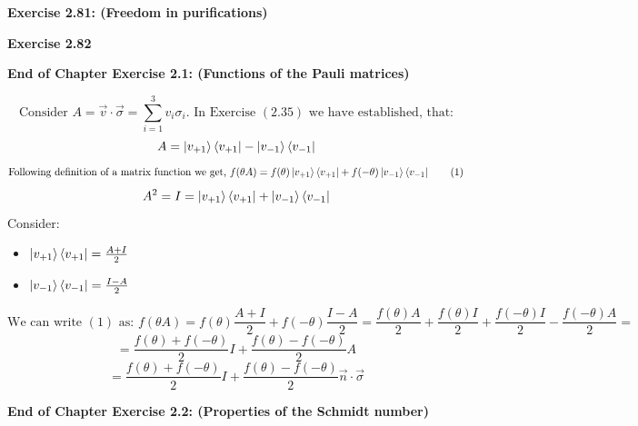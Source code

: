 \documentclass{article}
\begin{document}
\bigskip

\begin{framed}
    \noindent \textbf{Exercise 2.81: (Freedom in purifications)}
    
    \medskip
    
    
\end{framed}

\bigskip

\begin{framed}
    \noindent \textbf{Exercise 2.82}
    
    \medskip
    
    
\end{framed}

\bigskip

\begin{framed}
    \noindent \textbf{End of Chapter Exercise 2.1: (Functions of the Pauli matrices)}
    
    \medskip
    $$
    \text{Consider } A = \vec{v} \cdot \vec{\sigma} = \sum_{i=1}^{3}{v_i\sigma_i}. \text{ In Exercise } (2.35)  \text{ we have established, that:}
    $$
    $$
        A = \ket{v_{+1}}\bra{v_{+1}} - \ket{v_{-1}}\bra{v_{-1}}
    $$
    \begin{equation}
    \text{Following definition of a matrix function we get, } f(\theta A) = f(\theta)\ket{v_{+1}}\bra{v_{+1}}+f(-\theta)\ket{v_{-1}}\bra{v_{-1}}
    \tag{1}
    \end{equation}
    $$
    A^2 = I = \ket{v_{+1}}\bra{v_{+1}} + \ket{v_{-1}}\bra{v_{-1}} 
    $$
    Consider:
    \begin{itemize}
        \item $\ket{v_{+1}}\bra{v_{+1}} = \frac{A + I}{2}$
        \item $\ket{v_{-1}}\bra{v_{-1}} = \frac{I -A}{2}$
    \end{itemize}
    $$
    \text{We can write } (1) \text{ as: } f(\theta A) = f(\theta)\frac{A + I}{2} + f(-\theta) \frac{I -A}{2} = \frac{f(\theta)A}{2} + \frac{f(\theta)I}{2} + \frac{f(-\theta)I}{2} - \frac{f(-\theta)A}{2} = 
    $$
    $$
    = \frac{f(\theta) + f(-\theta)}{2}I + \frac{f(\theta) - f(-\theta)}{2}A 
    $$
    $$
    = \frac{f(\theta) + f(-\theta)}{2}I + \frac{f(\theta) - f(-\theta)}{2}\vec{n} \cdot \vec{\sigma} 
    $$
    
\end{framed}

\bigskip

\begin{framed}
    \noindent \textbf{End of Chapter Exercise 2.2: (Properties of the Schmidt number)}
    
    \medskip
    
    
\end{framed}
\end{document}
